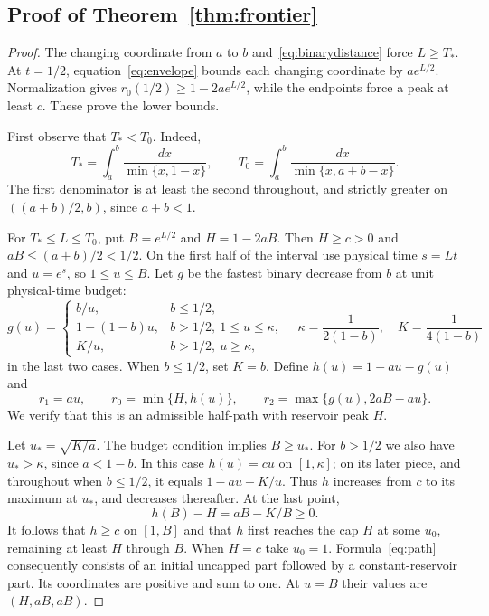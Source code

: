 \subsection{Proof of Theorem~\ref{thm:frontier}}
\begin{proof}
The changing coordinate from $a$ to $b$ and~\eqref{eq:binarydistance} force $L\ge T_*$. At $t=1/2$, equation~\eqref{eq:envelope} bounds each changing coordinate by $ae^{L/2}$. Normalization gives $r_0(1/2)\ge1-2ae^{L/2}$, while the endpoints force a peak at least $c$. These prove the lower bounds.

First observe that $T_*<T_0$. Indeed,
\[
 T_*=\int_a^b\frac{dx}{\min\{x,1-x\}},\qquad
 T_0=\int_a^b\frac{dx}{\min\{x,a+b-x\}}.
\]
The first denominator is at least the second throughout, and strictly greater on $((a+b)/2,b)$, since $a+b<1$.

For $T_*\le L\le T_0$, put $B=e^{L/2}$ and $H=1-2aB$. Then $H\ge c>0$ and $aB\le(a+b)/2<1/2$. On the first half of the interval use physical time $s=Lt$ and $u=e^s$, so $1\le u\le B$. Let $g$ be the fastest binary decrease from $b$ at unit physical-time budget:
\begin{equation}\label{eq:g}
 g(u)=\begin{cases}
 b/u,& b\le1/2,\\
 1-(1-b)u,&b>1/2,\ 1\le u\le\kappa,\\
 K/u,&b>1/2,\ u\ge\kappa,
 \end{cases}
 \quad
 \kappa=\frac1{2(1-b)},\quad K=\frac1{4(1-b)}
\end{equation}
in the last two cases. When $b\le1/2$, set $K=b$. Define $h(u)=1-au-g(u)$ and
\begin{equation}\label{eq:path}
 r_1=au,\qquad r_0=\min\{H,h(u)\},\qquad
 r_2=\max\{g(u),2aB-au\}.
\end{equation}
We verify that this is an admissible half-path with reservoir peak $H$.

Let $u_*=\sqrt{K/a}$. The budget condition implies $B\ge u_*$. For $b>1/2$ we also have $u_*>\kappa$, since $a<1-b$. In this case $h(u)=cu$ on $[1,\kappa]$; on its later piece, and throughout when $b\le1/2$, it equals $1-au-K/u$. Thus $h$ increases from $c$ to its maximum at $u_*$, and decreases thereafter. At the last point,
\[
 h(B)-H=aB-K/B\ge0.
\]
It follows that $h\ge c$ on $[1,B]$ and that $h$ first reaches the cap $H$ at some $u_0$, remaining at least $H$ through $B$. When $H=c$ take $u_0=1$. Formula~\eqref{eq:path} consequently consists of an initial uncapped part followed by a constant-reservoir part. Its coordinates are positive and sum to one. At $u=B$ their values are $(H,aB,aB)$.


\end{proof}
